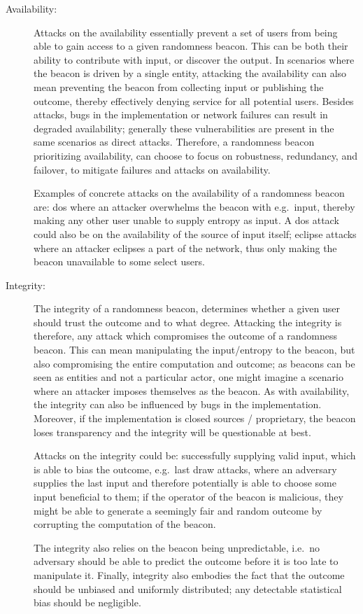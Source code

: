 \begin{description}

    \item[Availability:]
        Attacks on the availability essentially prevent a set of users from being able to gain access to a given randomness beacon.
        This can be both their ability to contribute with input, or discover the output.
        In scenarios where the beacon is driven by a single entity, attacking the availability can also mean preventing the beacon from collecting input or publishing the outcome, thereby effectively denying service for all potential users.
        Besides attacks, bugs in the implementation or network failures can result in degraded availability;
        generally these vulnerabilities are present in the same scenarios as direct attacks.
        Therefore, a randomness beacon prioritizing availability, can choose to focus on robustness, redundancy, and failover, to mitigate failures and attacks on availability.

        Examples of concrete attacks on the availability of a randomness beacon are:
        \acrfull{dos} where an attacker overwhelms the beacon with e.g.\ input, thereby making any other user unable to supply entropy as input. A \gls{dos} attack could also be on the availability of the source of input itself; eclipse attacks where an attacker eclipses a part of the network, thus only making the beacon unavailable to some select users.

    \item[Integrity:]
        The integrity of a randomness beacon, determines whether a given user should trust the outcome and to what degree.
        Attacking the integrity is therefore, any attack which compromises the outcome of a randomness beacon.
        This can mean manipulating the input/entropy to the beacon, but also compromising the entire computation and outcome;
        as beacons can be seen as entities and not a particular actor, one might imagine a scenario where an attacker imposes themselves as the beacon.
        As with availability, the integrity can also be influenced by bugs in the implementation.
        Moreover, if the implementation is closed sources / proprietary, the beacon loses transparency and the integrity will be questionable at best.

        Attacks on the integrity could be: successfully supplying valid input, which is able to bias the outcome, e.g.\ last draw attacks, where an adversary supplies the last input and therefore potentially is able to choose some input beneficial to them;
        if the operator of the beacon is malicious, they might be able to generate a seemingly fair and random outcome by corrupting the computation of the beacon.

        The integrity also relies on the beacon being unpredictable, i.e.\ no adversary should be able to predict the outcome before it is too late to manipulate it.
        Finally, integrity also embodies the fact that the outcome should be unbiased and uniformly distributed; any detectable statistical bias should be negligible.

\end{description}

